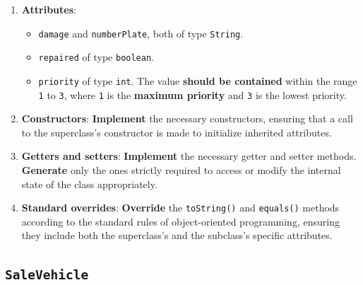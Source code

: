 \begin{enumerate}

    \item \textbf{Attributes}:

        \begin{itemize}

            \item \texttt{damage} and \texttt{numberPlate}, both of type \texttt{String}.

            \item \texttt{repaired} of type \texttt{boolean}.

            \item \texttt{priority} of type \texttt{int}. The value \textbf{should be contained} within the range \texttt{1} to \texttt{3}, where \texttt{1} is the \textbf{maximum priority} and \texttt{3} is the lowest priority.

        \end{itemize}

    \item \textbf{Constructors}: \textbf{Implement} the necessary constructors, ensuring that a call to the superclass's constructor is made to initialize inherited attributes.

    \item \textbf{Getters and setters}: \textbf{Implement} the necessary getter and setter methods. \textbf{Generate} only the ones strictly required to access or modify the internal state of the class appropriately.

    \item \textbf{Standard overrides}: \textbf{Override} the \texttt{toString()} and \texttt{equals()} methods according to the standard rules of object-oriented programming, ensuring they include both the superclass's and the subclass's specific attributes.

\end{enumerate}

\subsection{\texttt{SaleVehicle}}


